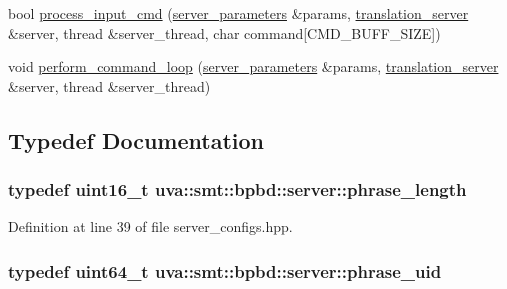 \begin{DoxyCompactItemize}
\item 
bool \hyperlink{namespaceuva_1_1smt_1_1bpbd_1_1server_a4385d92deb1529577d431efd2aa5d892}{process\+\_\+input\+\_\+cmd} (\hyperlink{structuva_1_1smt_1_1bpbd_1_1server_1_1server__parameters}{server\+\_\+parameters} \&params, \hyperlink{classuva_1_1smt_1_1bpbd_1_1server_1_1translation__server}{translation\+\_\+server} \&server, thread \&server\+\_\+thread, char command\mbox{[}C\+M\+D\+\_\+\+B\+U\+F\+F\+\_\+\+S\+I\+Z\+E\mbox{]})
\item 
void \hyperlink{namespaceuva_1_1smt_1_1bpbd_1_1server_ae58e404a227b2fc3b03fea84f7e91a83}{perform\+\_\+command\+\_\+loop} (\hyperlink{structuva_1_1smt_1_1bpbd_1_1server_1_1server__parameters}{server\+\_\+parameters} \&params, \hyperlink{classuva_1_1smt_1_1bpbd_1_1server_1_1translation__server}{translation\+\_\+server} \&server, thread \&server\+\_\+thread)
\end{DoxyCompactItemize}


\subsection{Typedef Documentation}
\hypertarget{namespaceuva_1_1smt_1_1bpbd_1_1server_af068a19c2e03116caf3e3827a3e40e35}{}
\subsubsection[{phrase\+\_\+length}]{\setlength{\rightskip}{0pt plus 5cm}typedef uint16\+\_\+t {\bf uva\+::smt\+::bpbd\+::server\+::phrase\+\_\+length}}\label{namespaceuva_1_1smt_1_1bpbd_1_1server_af068a19c2e03116caf3e3827a3e40e35}


Definition at line 39 of file server\+\_\+configs.\+hpp.

\hypertarget{namespaceuva_1_1smt_1_1bpbd_1_1server_ad18d4cdf5504e76c22b0c124ff60b44f}{}
\subsubsection[{phrase\+\_\+uid}]{\setlength{\rightskip}{0pt plus 5cm}typedef uint64\+\_\+t {\bf uva\+::smt\+::bpbd\+::server\+::phrase\+\_\+uid}}\label{namespaceuva_1_1smt_1_1bpbd_1_1server_ad18d4cdf5504e76c22b0c124ff60b44f}


